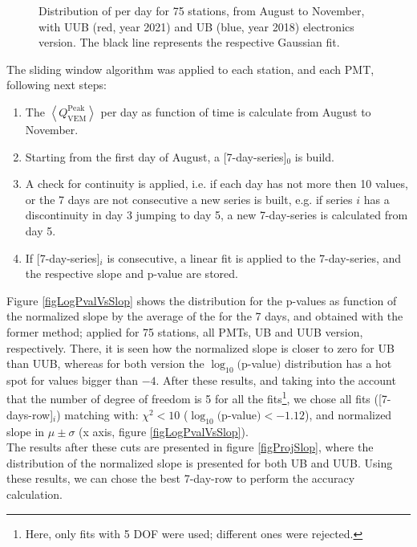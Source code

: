 \documentclass[twoside, final, 10pt]{articleMine}
\begin{document}
\begin{figure}[!t]
  \label{figDistQpkPerDay}
  \centering
  \caption{Distribution of \qpkvem per day for 75 stations, from
  August to November, with UUB (red, year 2021) and UB (blue,
  year 2018) electronics version. The black line represents the
  respective Gaussian fit.}
  \label{figDistQpkPerDay}
\end{figure}

The sliding window algorithm was applied to each
station, and each PMT, following next steps:
\begin{enumerate}
  \item The $\left< Q^{\mathrm{Peak}}_{\mathrm{VEM}}\right>$ per
    day as function of time is calculate from August to November.
  \item Starting from the first day of August, a
    [7-day-series]$_0$ is build.
  \item A check for continuity is applied, i.e. if each day has
    not more then 10 \qpkvem values, or the 7 days are not
    consecutive a new series is built, e.g. if series $i$ has a
    discontinuity in day 3 jumping to day 5, a new 7-day-series
    is calculated from day 5.
  \item If [7-day-series]$_i$ is consecutive, a linear fit is
    applied to the 7-day-series, and the respective slope and
    p-value are stored.
\end{enumerate}

Figure \ref{figLogPvalVsSlop} shows the distribution for the
p-values as function of the normalized slope by the average of
the \qpkvem for the 7 days, and obtained with the former method;
applied for 75 stations, all PMTs, UB and UUB version,
respectively. There, it is seen how the normalized slope is
closer to zero for UB than UUB, whereas for both version the
$\log_{10}($p-value$)$ distribution has a hot spot for values
bigger than $-4$. After these results, and taking into the account 
that the number of degree of freedom is 5 for all the
fits\footnote{Here, only fits with 5 DOF were used; different
ones were rejected.}, we chose all fits ([7-days-row]$_i$)
matching with: $\chi^2<10$ ($\log_{10}($p-value$)<-1.12$), and
normalized slope in $\mu\pm\sigma$ (x axis, figure
\ref{figLogPvalVsSlop}).\\The results after these cuts are
presented in figure \ref{figProjSlop}, where the distribution of
the normalized slope is presented for both UB and UUB. Using
these results, we can chose the best 7-day-row to perform the
accuracy calculation.
\clearpage
\end{document}
